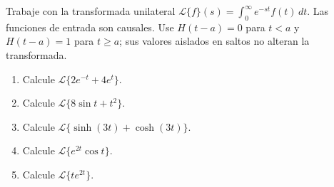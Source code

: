 Trabaje con la transformada unilateral $\mathcal L\{f\}(s)=\int_0^\infty e^{-st}f(t)\,dt$. Las funciones de entrada son causales. Use $H(t-a)=0$ para $t<a$ y $H(t-a)=1$ para $t\ge a$; sus valores aislados en saltos no alteran la transformada.

\begin{enumerate}[label=(\alph*),ref=\alph*,leftmargin=*]
\item Calcule $\mathcal L\{2e^{-t}+4e^t\}$.
\item Calcule $\mathcal L\{8\sin t+t^2\}$.
\item Calcule $\mathcal L\{\sinh(3t)+\cosh(3t)\}$.
\item Calcule $\mathcal L\{e^{2t}\cos t\}$.
\item Calcule $\mathcal L\{te^{2t}\}$.
\end{enumerate}
